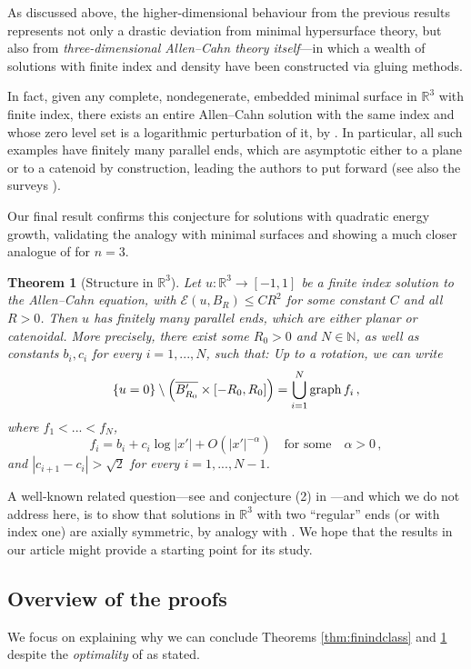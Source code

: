 \documentclass{article}
\newcommand{\N}{\mathbb{N}}
\newcommand{\R}{\mathbb{R}}
\newtheorem{theorem}{Theorem}[section]
\theoremstyle{definition}
\begin{document}
As discussed above, the higher-dimensional behaviour from the previous results represents not only a drastic deviation from minimal hypersurface theory, but also from \textit{three-dimensional Allen--Cahn theory itself}---in which a wealth of solutions with finite index and density have been constructed via gluing methods.

In fact, given any complete, nondegenerate, embedded minimal surface in $\R^3$ with finite index, there exists an entire Allen--Cahn solution with the same index and whose zero level set is a logarithmic perturbation of it, by \cite{dPKW13}. In particular, all such examples have finitely many parallel ends, which are asymptotic either to a plane or to a catenoid by construction, leading the authors to put forward  (see also the surveys \cite{dPKW2009survey,dPKW12}).

Our final result confirms this conjecture for solutions with quadratic energy growth, validating the analogy with minimal surfaces and showing a much closer analogue of  for $n=3$.
\begin{theorem}[Structure in $\R^3$]\label{thm:R3indclass}
    Let $u:\R^3\to[-1,1]$ be a finite index solution to the Allen--Cahn equation, with $\mathcal E(u,B_R)\leq CR^2$ for some constant $C$ and all $R>0$. Then $u$ has finitely many parallel ends, which are either planar or catenoidal. More precisely, there exist some $R_0>0$ and $N\in\N$, as well as constants $b_i,c_i$ for every $i=1,...,N$, such that: Up to a rotation, we can write
    \begin{equation}
        \{u=0\} \setminus \left(\overline{B_{R_0}'}\times[-R_0,R_0]\right)=\bigcup_{i=1}^N {\rm graph}\, f_i\,,
    \end{equation}
    where $f_1<...<f_N$, 
    $$f_i=b_i+c_i\log |x'|+O(|x'|^{-\alpha})\quad\mbox{for some}\quad \alpha>0\,,$$
    and $|c_{i+1}-c_i|> \sqrt{2}$ for every $i=1,...,N-1$.
\end{theorem}
A well-known related question---see \cite{GuiLiuWei,dPKW12} and conjecture (2) in \cite[p. 127]{dPKW13}---and which we do not address here, is to show that solutions in $\R^3$ with two ``regular'' ends (or with index one) are axially symmetric, by analogy with \cite{Schoen83}. We hope that the results in our article might provide a starting point for its study.

\subsection{Overview of the proofs}\label{sec:overproof}
We focus on explaining why we can conclude Theorems \ref{thm:finindclass} and \ref{thm:R3indclass} despite the {\it optimality} of  as stated.
\end{document}
